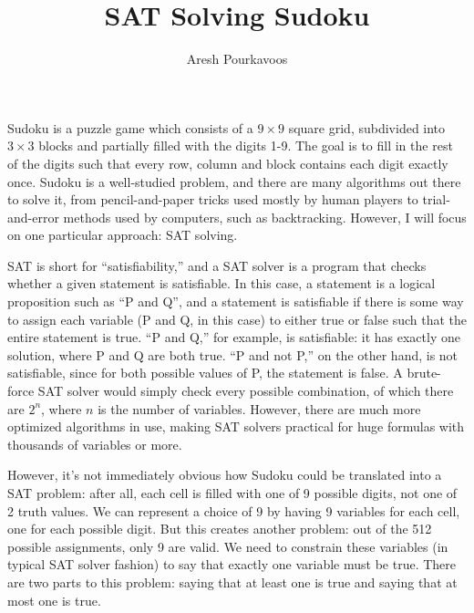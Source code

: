 \documentclass{article}
\begin{document}
\title{SAT Solving Sudoku}
\author{Aresh Pourkavoos}
\maketitle

Sudoku is a puzzle game which consists of a $9 \times 9$ square grid,
subdivided into $3 \times 3$ blocks
and partially filled with the digits 1-9.
The goal is to fill in the rest of the digits such that
every row, column and block contains each digit exactly once.
Sudoku is a well-studied problem,
and there are many algorithms out there to solve it,
from pencil-and-paper tricks used mostly by human players
to trial-and-error methods used by computers, such as backtracking.
However, I will focus on one particular approach: SAT solving.

SAT is short for ``satisfiability,''
and a SAT solver is a program that checks
whether a given statement is satisfiable.
In this case, a statement is a logical proposition
such as ``P and Q'',
and a statement is satisfiable
if there is some way to assign each variable
(P and Q, in this case) to either true or false
such that the entire statement is true.
``P and Q,'' for example, is satisfiable:
it has exactly one solution, where P and Q are both true.
``P and not P,'' on the other hand, is not satisfiable,
since for both possible values of P, the statement is false.
A brute-force SAT solver would simply check every possible combination,
of which there are $2^n$, where $n$ is the number of variables.
However, there are much more optimized algorithms in use,
making SAT solvers practical for huge formulas with thousands of variables or more.

However, it's not immediately obvious
how Sudoku could be translated into a SAT problem:
after all, each cell is filled with one of 9 possible digits,
not one of 2 truth values.
We can represent a choice of 9 by having 9 variables for each cell,
one for each possible digit.
But this creates another problem:
out of the 512 possible assignments, only 9 are valid.
We need to constrain these variables (in typical SAT solver fashion)
to say that exactly one variable must be true.
There are two parts to this problem:
saying that at least one is true
and saying that at most one is true.
\end{document}
